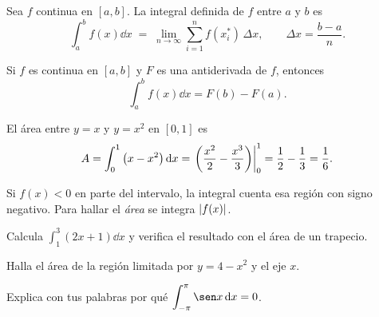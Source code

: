 \documentclass[11pt]{article}
\begin{document}
\encabezado


\begin{definicion}
Sea $f$ continua en $[a,b]$. La integral definida de $f$ entre $a$ y $b$ es
\[
  \int_a^b f(x)\dd x \;=\; \lim_{n\to\infty} \sum_{i=1}^{n} f(x_i^{*})\,\Delta x,
  \qquad \Delta x = \frac{b-a}{n}.
\]
\end{definicion}

\begin{teorema}
Si $f$ es continua en $[a,b]$ y $F$ es una antiderivada de $f$, entonces
\[
  \int_a^b f(x)\dd x = F(b) - F(a).
\]
\end{teorema}

\begin{ejemplo}
El área entre $y = x$ y $y = x^2$ en $[0,1]$ es
\[
  A = \int_0^1 \left(x - x^2\right)\mathop{}\!\mathrm{d} x
    = \left.\left(\frac{x^2}{2} - \frac{x^3}{3}\right)\right|_{0}^{1}
    = \frac12 - \frac13 = \frac16 .
\]

\begin{center}
\end{center}
\end{ejemplo}

\begin{nota}
Si $f(x) < 0$ en parte del intervalo, la integral cuenta esa región con
signo negativo. Para hallar el \emph{área} se integra $\lvert f(x)\rvert$.
\end{nota}


\begin{preguntas}

\pregunta Calcula $\displaystyle\int_1^3 \left(2x + 1\right)\dd x$ y
verifica el resultado con el área de un trapecio.
\espacio{3cm}

\pregunta Halla el área de la región limitada por $y = 4 - x^2$ y el eje $x$.
\espacio{3cm}

\pregunta Explica con tus palabras por qué $\displaystyle\int_{-\pi}^{\pi}
\sen x \dd x = 0$.

\end{preguntas}
\end{document}
